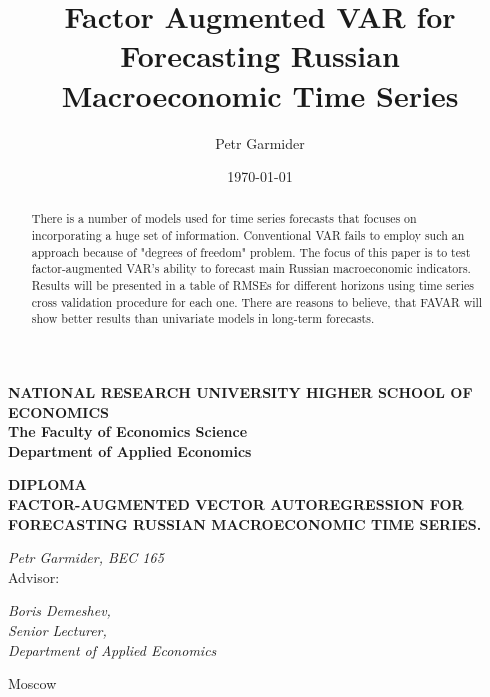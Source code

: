 \documentclass[a4paper, 14pt]{article}
\title{Factor Augmented VAR for Forecasting Russian Macroeconomic Time Series}
\author{Petr Garmider}
\date{\today}
\begin{document}
	\newpage
	\thispagestyle{empty}
	\begin{center}
		
		\vspace{0.1ex}
		
		{\textbf{NATIONAL RESEARCH UNIVERSITY HIGHER SCHOOL OF ECONOMICS}}\\
		\vspace{1ex}
		{\textbf{The Faculty of Economics Science}}\\
		\vspace{1ex}
		{\textbf{
				Department of Applied Economics}}\\
		
	\end{center}
	\vspace{5ex}
	\begin{center}
		\vspace{3ex}
		{\textbf{DIPLOMA}}\\
		\vspace{3ex}
		{
			\vspace{2ex} \textbf{FACTOR-AUGMENTED VECTOR AUTOREGRESSION FOR FORECASTING RUSSIAN MACROECONOMIC TIME SERIES.}}
	\end{center}
	\begin{flushright}
		\vspace{5ex}
		\noindent
		\textit{Petr Garmider, BEC 165}
		\\
		\vspace{5ex}
		Advisor:\\
		\vspace{2ex}
		
		\textit{Boris Demeshev, \\Senior Lecturer, \\Department of Applied Economics}\\
		
		
	\end{flushright}

	\vspace{18ex}
	
	\begin{center}
		\vspace{3ex}
		{Moscow}\\
		\vspace{1ex}{28 February 2020}
	\end{center}	
	
	\newpage
	
\begin{abstract}
	There is a number of models used for time series forecasts that focuses on incorporating a huge set of information. Conventional VAR fails to employ such an approach because of "degrees of freedom" problem. The focus of this paper is to test factor-augmented VAR's ability to forecast main Russian macroeconomic indicators. Results will be presented in a table of RMSEs for different horizons using time series cross validation procedure for each one. There are reasons to believe, that FAVAR will show better results than univariate models in long-term forecasts. 
\end{abstract}
\end{document}
